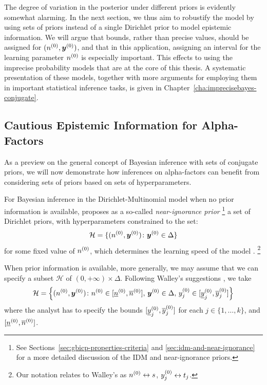 The degree of variation in the posterior under different priors is evidently somewhat alarming.
In the next section, we thus aim to robustify the model by using sets of priors
instead of a single Dirichlet prior to model epistemic information.
We will argue that bounds, rather than precise values,
should be assigned for $(n^{(0)},{\bm y}^{(0)})$, and that in this application,
assigning an interval for the learning parameter $n^{(0)}$ is especially important.
This effects to using the imprecise probability models that are at the core of this thesis.
A systematic presentation of these models,
together with more arguments for employing them in important statistical inference tasks,
is given in Chapter~\ref{cha:imprecisebayes-conjugate}.


\subsection{Cautious Epistemic Information for Alpha-Factors}
\label{sec:imprecise-alpha}

As a preview on the general concept of Bayesian inference with sets of conjugate priors,
we will now demonstrate how inferences on alpha-factors can benefit from
considering sets of priors based on sets of hyperparameters.

For Bayesian inference in the Dirichlet-Multinomial model
when no prior information is available,
\textcite{1996:walley::idm} proposes as a so-called \emph{near-ignorance prior}%
\footnote{See Sections~\ref{sec:gbicp-properties-criteria} and \ref{sec:idm-and-near-ignorance}
for a more detailed discussion of the IDM and near-ignorance priors.}
a set of Dirichlet priors,
with hyperparameters constrained to the set:
\begin{equation*}
  \mathcal{H}=\{(n^{(0)},{\bm y}^{(0)})\colon{\bm y}^{(0)}\in\Delta\}
\end{equation*}
for some fixed value of $n^{(0)}$, which determines the learning speed of the model
\parencites[p.~218, \S 5.3.2]{1991:walley}[p.~9, \S 2.3]{1996:walley::idm}.%
\footnote{Our notation relates to Walley's as $n^{(0)} \leftrightarrow s$, $y^{(0)}_j \leftrightarrow t_j$.}

When prior information is available, more generally,
we may assume that we can specify a subset $\mathcal{H}$ of $(0,+\infty)\times\Delta$.
Following Walley's suggestions
\parencites[p.~224, \S 5.4.3]{1991:walley}[p.~32, \S 6]{1996:walley::idm},
we take
\begin{equation}
  \label{eq:hyperparams:boxmodel}
  \mathcal{H}
  =
  \left\{
  (n^{(0)},{\bm y}^{(0)})
  \colon
  n^{(0)}\in[\underline{n}^{(0)},\overline{n}^{(0)}],\,
  {\bm y}^{(0)}\in\Delta,\,
  y^{(0)}_j\in[\underline{y}^{(0)}_j,\overline{y}^{(0)}_j]
  \right\}
\end{equation}
where the analyst has to specify the bounds
$[\underline{y}^{(0)}_j,\overline{y}^{(0)}_j]$ for each $j\in\{1,\dots,k\}$,
and $[\underline{n}^{(0)},\overline{n}^{(0)}]$.

